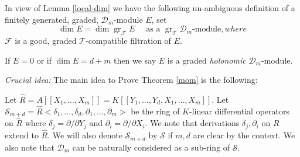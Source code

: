 \documentclass{amsart}
\newcommand{\D}{\mathcal{D} }
\newcommand{\T}{\mathcal{T} }
\newcommand{\F}{\mathcal{F} }
\newcommand{\Sc}{\mathcal{S} }
\newcommand{\gr}{\operatorname{gr}}
\theoremstyle{plain}
\theoremstyle{definition}
\theoremstyle{remark}
\begin{document}
 \s In view of Lemma \ref{local-dim} we have the following un-ambiguous definition of
 a  finitely generated, graded, $\D_m$-module $E$,
 set
 \[
 \dim E = \dim \gr_\F E   \quad \text{ as a $\gr_\T \D_m$-module}, where
 \]
 $\F$ is a good, graded $\T$-compatible filtration of $E$.
 
 If $E = 0$ or if $\dim E = d + m$ then we say $E$ is a graded \textit{holonomic }$\D_m$-module.
 
 \s \textit{Crucial idea:} The main idea to Prove Theorem \ref{mom} is the following:
 
 Let $\widehat{R} = A[[X_1,\ldots, X_m]] = K[[Y_1,\ldots, Y_d, X_1,\ldots, X_m]]$. Let $\Sc_{m+d} = \widehat{R}<\delta_1,\ldots, \delta_d, \partial_1,\ldots,\partial_m>$ be the ring of $K$-linear differential operators on $\widehat{R}$ where $\delta_j = \partial/\partial Y_j$ and $\partial_i = \partial/\partial X_i$.
  We note that derivations $\delta_j, \partial_i$ on $R$ extend to $\widehat{R}$. We will also denote $\Sc_{m+d}$ by $\Sc$ if $m,d$ are clear by the context. We also note that $\D_m$ can be naturally considered as a sub-ring of $\Sc$.
 
\end{document}
